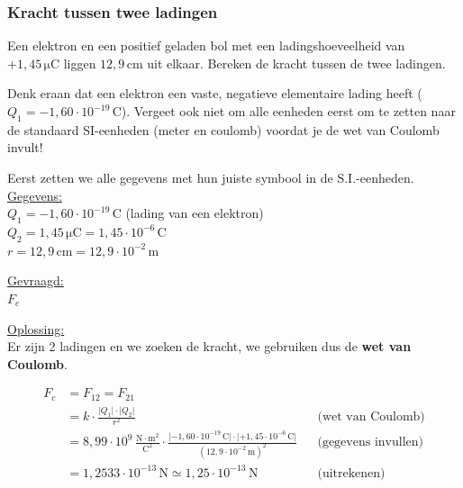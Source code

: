 \documentclass{ximera}
\begin{document}
\subsubsection{Kracht tussen twee ladingen}
\begin{example}[foldable=true,title={Voorbeeld: De kracht tussen twee geladen systemen}]\nl
    Een elektron en een positief geladen bol met een ladingshoeveelheid van $+1{,}45 \, \mathrm{\mu C}$ liggen $12{,}9 \, \mathrm{cm}$ uit elkaar. Bereken de kracht tussen de twee ladingen.
    
    \begin{hint}
        Denk eraan dat een elektron een vaste, negatieve elementaire lading heeft ($Q_1 = -1{,}60 \cdot 10^{-19} \, \mathrm{C}$). Vergeet ook niet om alle eenheden eerst om te zetten naar de standaard SI-eenheden (meter en coulomb) voordat je de wet van Coulomb invult!
    \end{hint}

    \begin{solution}\nl
        Eerst zetten we alle gegevens met hun juiste symbool in de S.I.-eenheden.\\[1ex]
        
        \underline{Gegevens:}\\
        $Q_{1} = -1{,}60 \cdot 10^{-19} \, \mathrm{C}$ \quad (lading van een elektron)\\
        $Q_{2} = 1{,}45 \, \mathrm{\mu C} = 1{,}45 \cdot 10^{-6} \, \mathrm{C}$\\
        $r = 12{,}9 \, \mathrm{cm} = 12{,}9 \cdot 10^{-2} \, \mathrm{m}$
        
        \vspace{2ex}
        \underline{Gevraagd:}\\
        $F_{c}$
        
        \vspace{2ex}
        \underline{Oplossing:}\\
        Er zijn 2 ladingen en we zoeken de kracht, we gebruiken dus de \textbf{wet van Coulomb}.
        
        \begin{align*}
            F_{c} &= F_{12} = F_{21} \\
            &= k \cdot \frac{\lvert Q_{1}\rvert \cdot \lvert Q_{2}\rvert}{r^{2}} && \text{(wet van Coulomb)} \\
            &= 8{,}99 \cdot 10^9 \, \mathrm{\frac{N\cdot m^2}{C^2}} \cdot \frac{\lvert -1{,}60 \cdot 10^{-19} \, \mathrm{C}\rvert \cdot \lvert +1{,}45 \cdot 10^{-6} \, \mathrm{C}\rvert}{(12{,}9 \cdot 10^{-2} \, \mathrm{m})^{2}} && \text{(gegevens invullen)} \\
            &= 1{,}2533 \cdot 10^{-13} \, \mathrm{N} \simeq 1{,}25 \cdot 10^{-13} \, \mathrm{N} && \text{(uitrekenen)}
        \end{align*}
    \end{solution}
\end{example}
\end{document}
